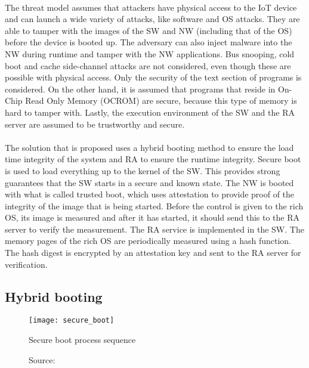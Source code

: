 \paragraph*{}
The threat model assumes that attackers have physical access to the IoT device and can launch a wide variety of attacks, like software and OS attacks. They are able to tamper with the images of the SW and NW (including that of the OS) before the device is booted up. The adversary can also inject malware into the NW during runtime and tamper with the NW applications. Bus snooping, cold boot and cache side-channel attacks are not considered, even though these are possible with physical access. Only the security of the text section of programs is considered. On the other hand, it is assumed that programs that reside in On-Chip Read Only Memory (OCROM) are secure, because this type of memory is hard to tamper with. Lastly, the execution environment of the SW and the RA server are assumed to be trustworthy and secure.

\paragraph*{}
The solution that is proposed uses a hybrid booting method to ensure the load time integrity of the system and RA to ensure the runtime integrity. Secure boot is used to load everything up to the kernel of the SW. This provides strong guarantees that the SW starts in a secure and known state. The NW is booted with what is called trusted boot, which uses attestation to provide proof of the integrity of the image that is being started. Before the control is given to the rich OS, its image is measured and after it has started, it should send this to the RA server to verify the measurement. The RA service is implemented in the SW. The memory pages of the rich OS are periodically measured using a hash function. The hash digest is encrypted by an attestation key and sent to the RA server for verification.

\subsection*{Hybrid booting}

\begin{figure}[h]
\centering
\texttt{[image: secure\_boot]}
\caption{Secure boot process sequence}
\caption*{Source: \cite{LingZhen2021Sbtb}}
\label{secureboot}
\end{figure}

